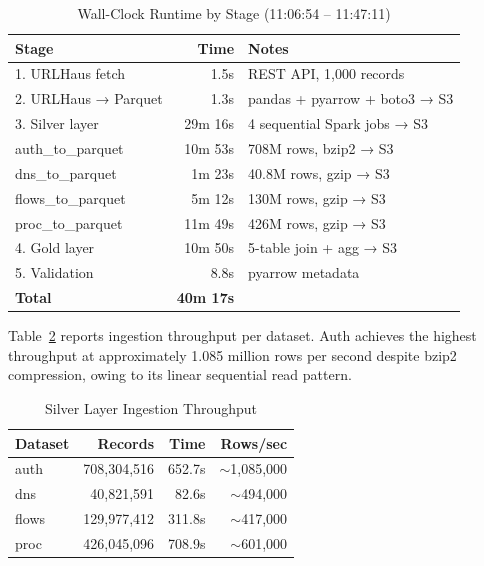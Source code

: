 \documentclass[conference]{IEEEtran}
\begin{document}
\begin{table}[htbp]
\caption{Wall-Clock Runtime by Stage (11:06:54 -- 11:47:11)}
\label{tab:perf}
\centering
\begin{tabular}{lrl}
\toprule
\textbf{Stage} & \textbf{Time} & \textbf{Notes} \\
\midrule
1. URLHaus fetch      & 1.5s      & REST API, 1{,}000 records \\
2. URLHaus → Parquet  & 1.3s      & pandas + pyarrow + boto3 → S3 \\
3. Silver layer       & 29m 16s   & 4 sequential Spark jobs → S3 \\
\quad auth\_to\_parquet  & 10m 53s & 708M rows, bzip2 → S3 \\
\quad dns\_to\_parquet   & 1m 23s  & 40.8M rows, gzip → S3 \\
\quad flows\_to\_parquet & 5m 12s  & 130M rows, gzip → S3 \\
\quad proc\_to\_parquet  & 11m 49s & 426M rows, gzip → S3 \\
4. Gold layer         & 10m 50s   & 5-table join + agg → S3 \\
5. Validation         & 8.8s      & pyarrow metadata \\
\midrule
\textbf{Total}        & \textbf{40m 17s} & \\
\bottomrule
\end{tabular}
\end{table}

Table~\ref{tab:throughput} reports ingestion throughput per dataset. Auth achieves the highest throughput at approximately 1.085 million rows per second despite bzip2 compression, owing to its linear sequential read pattern.

\begin{table}[htbp]
\caption{Silver Layer Ingestion Throughput}
\label{tab:throughput}
\centering
\begin{tabular}{lrrr}
\toprule
\textbf{Dataset} & \textbf{Records} & \textbf{Time} & \textbf{Rows/sec} \\
\midrule
auth  & 708,304,516 & 652.7s & $\sim$1,085,000 \\
dns   & 40,821,591  & 82.6s  & $\sim$494,000 \\
flows & 129,977,412 & 311.8s & $\sim$417,000 \\
proc  & 426,045,096 & 708.9s & $\sim$601,000 \\
\bottomrule
\end{tabular}
\end{table}
\end{document}
